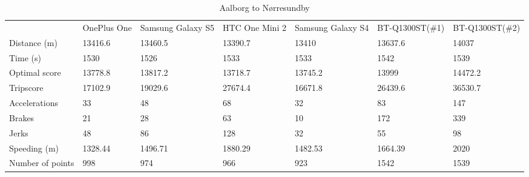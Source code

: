 \begin{table}[]
\centering
\caption{Aalborg to Nørresundby}
\label{my-label}
\begin{tabular}{lllllll}
                 & OnePlus One & Samsung Galaxy S5 & HTC One Mini 2 & Samsung Galaxy S4 & BT-Q1300ST(\#1) & BT-Q1300ST(\#2) \\
Distance (m)     & 13416.6     & 13460.5           & 13390.7        & 13410             & 13637.6         & 14037           \\
Time (s)         & 1530        & 1526              & 1533           & 1533              & 1542            & 1539            \\
Optimal score    & 13778.8     & 13817.2           & 13718.7        & 13745.2           & 13999           & 14472.2         \\
Tripscore        & 17102.9     & 19029.6           & 27674.4        & 16671.8           & 26439.6         & 36530.7         \\
Accelerations    & 33          & 48                & 68             & 32                & 83              & 147             \\
Brakes           & 21          & 28                & 63             & 10                & 172             & 339             \\
Jerks            & 48          & 86                & 128            & 32                & 55              & 98              \\
Speeding (m)     & 1328.44     & 1496.71           & 1880.29        & 1482.53           & 1664.39         & 2020            \\
Number of points & 998         & 974               & 966            & 923               & 1542            & 1539           
\end{tabular}
\end{table}

